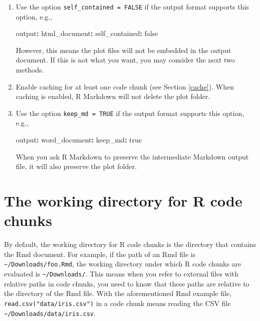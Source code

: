 \documentclass[
  11pt,
]{krantz}
\newenvironment{Shaded}{\begin{snugshade}}{\end{snugshade}}
\newcommand{\AttributeTok}[1]{\textcolor[rgb]{0.61,0.61,0.61}{#1}}
\newcommand{\CharTok}[1]{\textcolor[rgb]{0.5,0.5,0.5}{#1}}
\newcommand{\FunctionTok}[1]{\textcolor[rgb]{0,0,0}{#1}}
\newcommand{\KeywordTok}[1]{\textcolor[rgb]{0.27,0.27,0.27}{\textbf{#1}}}
\begin{document}
\begin{enumerate}
\def\labelenumi{\arabic{enumi}.}
\item
  Use the option \texttt{self\_contained\ =\ FALSE} if the output format supports this option, e.g.,

\begin{Shaded}
\begin{Highlighting}[]
\FunctionTok{output}\KeywordTok{:}
\AttributeTok{  }\FunctionTok{html_document}\KeywordTok{:}
\AttributeTok{    }\FunctionTok{self_contained}\KeywordTok{:}\AttributeTok{ }\CharTok{false}
\end{Highlighting}
\end{Shaded}

  However, this means the plot files will not be embedded in the output document. If this is not what you want, you may consider the next two methods.
\item
  Enable caching for at least one code chunk (see Section \ref{cache}). When caching is enabled, R Markdown will not delete the plot folder.
\item
  Use the option \texttt{keep\_md\ =\ TRUE} if the output format supports this option, e.g.,

\begin{Shaded}
\begin{Highlighting}[]
\FunctionTok{output}\KeywordTok{:}
\AttributeTok{  }\FunctionTok{word_document}\KeywordTok{:}
\AttributeTok{    }\FunctionTok{keep_md}\KeywordTok{:}\AttributeTok{ }\CharTok{true}
\end{Highlighting}
\end{Shaded}

  When you ask R Markdown to preserve the intermediate Markdown output file, it will also preserve the plot folder.
\end{enumerate}

\hypertarget{working-directory}{%
\section{The working directory for R code chunks}\label{working-directory}}

By default, the working directory for R code chunks is the directory that contains the Rmd document. For example, if the path of an Rmd file is \texttt{\textasciitilde{}/Downloads/foo.Rmd}, the working directory under which R code chunks are evaluated is \texttt{\textasciitilde{}/Downloads/}. This means when you refer to external files with relative paths in code chunks, you need to know that these paths are relative to the directory of the Rmd file. With the aforementioned Rmd example file, \texttt{read.csv("data/iris.csv")} in a code chunk means reading the CSV file \texttt{\textasciitilde{}/Downloads/data/iris.csv}.
\end{document}
